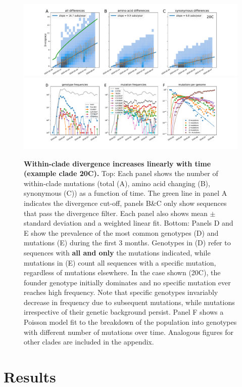\documentclass[aps,rmp, twocolumn]{revtex4}
\begin{document}
\begin{figure}[tb]
    \includegraphics[width=\textwidth]{figures/rtt/20C_rtt.pdf}
    \includegraphics[width=\textwidth]{figures/counts/20C_counts.pdf}
    \caption{{\bf Within-clade divergence increases linearly with time (example clade 20C).} Top: Each panel shows the number of within-clade mutations (total (A), amino acid changing (B), synonymous (C)) as a function of time.
    The green line in panel A indicates the divergence cut-off, panels B\&C only show sequences that pass the divergence filter. Each panel also shows mean $\pm$ standard deviation and a weighted linear fit.
    Bottom: Panels D and E show the prevalence of the most common genotypes (D) and mutations (E) during the first 3 months. Genotypes in (D) refer to sequences with {\bf all and only} the mutations indicated, while mutations in (E) count all sequences with a specific mutation, regardless of mutations elsewhere.
    In the case shown (20C), the founder genotype initially dominates and no specific mutation ever reaches high frequency. Note that specific genotypes invariably decrease in frequency due to subsequent mutations, while mutations irrespective of their genetic background persist. Panel F shows a Poisson model fit to the breakdown of the population into genotypes with different number of mutations over time. Analogous figures for other clades are included in the appendix.
    \label{fig:within_clade}}
\end{figure}

\section*{Results}
\end{document}
